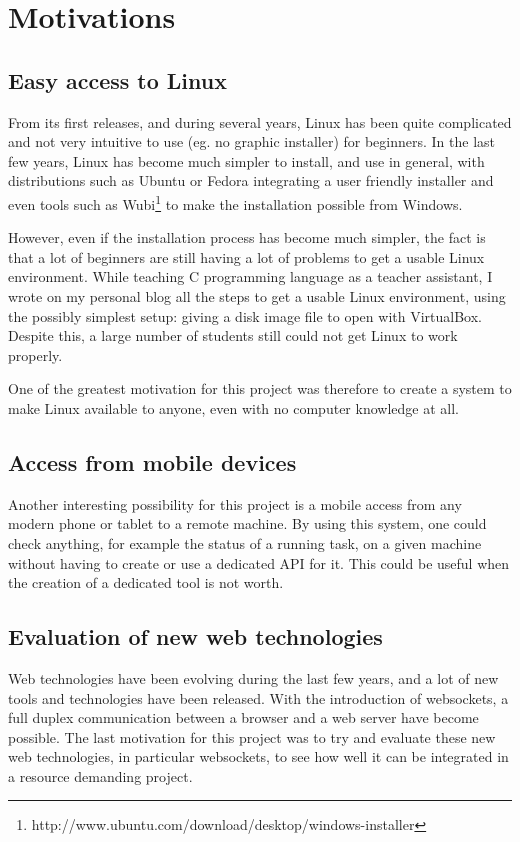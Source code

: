 \section{Motivations}
\subsection{Easy access to Linux}
From its first releases, and during several years, Linux has been quite 
complicated and not very intuitive to use (eg. no graphic installer) for beginners.
In the last few years, Linux has become much simpler to install, and use in general, 
with distributions such as Ubuntu or Fedora integrating a user friendly installer 
and even tools such as Wubi\footnote{http://www.ubuntu.com/download/desktop/windows-installer} 
to make the installation possible from Windows.

However, even if the installation process has become much simpler, the fact is that 
a lot of beginners are still having a lot of problems to get a usable Linux environment. 
While teaching C programming language as a teacher assistant, I wrote 
on my personal blog all the steps to get a usable Linux environment, using the 
possibly simplest setup: giving a disk image file to open with VirtualBox. 
Despite this, a large number of students still could not get Linux to work properly.

One of the greatest motivation for this project was therefore to create a system to 
make Linux available to anyone, even with no computer knowledge at all.
%
\subsection{Access from mobile devices}
Another interesting possibility for this project is a mobile access from any modern 
phone or tablet to a remote machine. By using this system, one could check anything,
for example the status of a running task,  on a given machine without having 
to create or use a dedicated API for it. This could be useful when the creation of 
a dedicated tool is not worth.
%
\subsection{Evaluation of new web technologies }
Web technologies have been evolving during the last few years, and a lot 
of new tools and technologies have been released. With the introduction of
websockets, a full duplex communication between a browser and a web server 
have become possible. 
The last motivation for this project was to try and evaluate these new web 
technologies, in particular websockets, to see how well it can be integrated 
in a resource demanding project.

